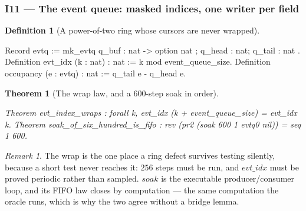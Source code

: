 \documentclass[10pt,journal,compsoc,twocolumn]{article}
\newtheorem{theorem}{Theorem}[section]
\theoremstyle{definition}
\newtheorem{definition}{Definition}[section]
\theoremstyle{remark}
\newtheorem{remark}{Remark}[section]
\theoremstyle{plain}
\begin{document}
\subsubsection*{I11 --- The event queue: masked indices, one writer per field}
\begin{definition}[A power-of-two ring whose cursors are never wrapped]
\begin{coc}
Record evtq := mk_evtq { q_buf : nat -> option nat
                        ; q_head : nat; q_tail : nat }.
Definition evt_idx (k : nat) : nat := k mod event_queue_size.
Definition occupancy (e : evtq) : nat := q_tail e - q_head e.
\end{coc}\end{definition}
\begin{theorem}[The wrap law, and a 600-step soak in order]
\begin{coc}
Theorem evt_index_wraps : forall k, evt_idx (k + event_queue_size) = evt_idx k.
Theorem soak_of_six_hundred_is_fifo : rev (pr2 (soak 600 1 evtq0 nil)) = seq 1 600.
\end{coc}\end{theorem}
\begin{remark}
The wrap is the one place a ring defect survives testing silently, because a
short test never reaches it: \(256\) steps must be run, and \(\mathit{evt\_idx}\)
must be proved periodic rather than sampled. \(\mathit{soak}\) is the executable
producer/consumer loop, and its FIFO law closes by computation --- the same
computation the oracle runs, which is why the two agree without a bridge lemma.
\end{remark}
\end{document}
